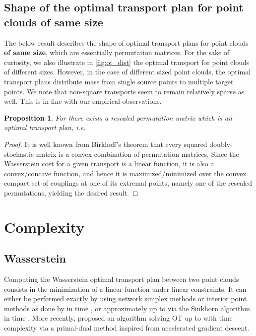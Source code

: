 \documentclass[letterpaper]{article} \usepackage{aaai22}  \usepackage{times}  \usepackage{helvet}  \usepackage{courier}  \usepackage[hyphens]{url}  \usepackage{graphicx} \urlstyle{rm} \def\UrlFont{\rm}  \usepackage{natbib}  \usepackage{caption} \DeclareCaptionStyle{ruled}{labelfont=normalfont,labelsep=colon,strut=off} \frenchspacing  \setlength{\pdfpagewidth}{8.5in}  \setlength{\pdfpageheight}{11in}  \usepackage{algorithm}
\newtheorem{proposition}{Proposition}
\begin{document}
\subsection{Shape of the optimal transport plan for point clouds of same size}\label{sec:proof-permu}
The below result describes the shape of optimal transport plans for point clouds \textbf{of same size}, which are essentially permutation matrices. For the sake of curiosity, we also illustrate in \cref{fig:ot_dist} the optimal transport for point clouds of different sizes. However, in the case of different sized point clouds, the optimal transport plans distribute mass from single source points to multiple target points. We note that non-square transports seem to remain relatively sparse as well. This is in line with our empirical observations.

\begin{proposition}\label{thm:permu}
For  there exists a rescaled permutation matrix  which is an optimal transport plan, i.e. 
 
\end{proposition}
\begin{proof}
It is well known from Birkhoff's theorem that every squared doubly-stochastic matrix is a convex combination of permutation matrices. Since the Wasserstein cost for a given transport  is a linear function, it is also a convex/concave function, and hence it is maximized/minimized over the convex compact set of couplings at one of its extremal points, namely one of the rescaled permutations, yielding the desired result.
\end{proof}




\section{Complexity} \label{apx:complexities}
\subsection{Wasserstein}
Computing the Wasserstein optimal transport plan between two point clouds consists in the minimization of a linear function under linear constraints. It can either be performed exactly by using network simplex methods or interior point methods as done by \citep{pele2009fast} in time , or approximately up to  via the Sinkhorn algorithm \citep{cuturi2013sinkhorn} in time . More recently, \citep{dvurechensky2018computational} proposed an algorithm solving OT up to  with time complexity  via a primal-dual method inspired from accelerated gradient descent.
\end{document}
